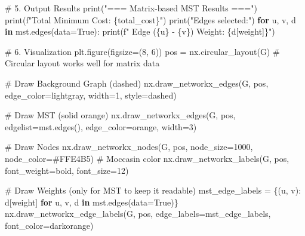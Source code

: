 \documentclass[
  letterpaper,
  DIV=11,
  numbers=noendperiod]{scrreprt}
\newenvironment{Shaded}{\begin{snugshade}}{\end{snugshade}}
\newcommand{\BuiltInTok}[1]{\textcolor[rgb]{0.00,0.23,0.31}{#1}}
\newcommand{\CommentTok}[1]{\textcolor[rgb]{0.37,0.37,0.37}{#1}}
\newcommand{\ControlFlowTok}[1]{\textcolor[rgb]{0.00,0.23,0.31}{\textbf{#1}}}
\newcommand{\DecValTok}[1]{\textcolor[rgb]{0.68,0.00,0.00}{#1}}
\newcommand{\KeywordTok}[1]{\textcolor[rgb]{0.00,0.23,0.31}{\textbf{#1}}}
\newcommand{\NormalTok}[1]{\textcolor[rgb]{0.00,0.23,0.31}{#1}}
\newcommand{\OperatorTok}[1]{\textcolor[rgb]{0.37,0.37,0.37}{#1}}
\newcommand{\SpecialCharTok}[1]{\textcolor[rgb]{0.37,0.37,0.37}{#1}}
\newcommand{\SpecialStringTok}[1]{\textcolor[rgb]{0.13,0.47,0.30}{#1}}
\newcommand{\StringTok}[1]{\textcolor[rgb]{0.13,0.47,0.30}{#1}}
\newcommand{\VariableTok}[1]{\textcolor[rgb]{0.07,0.07,0.07}{#1}}
\begin{document}
\begin{Shaded}
\begin{Highlighting}[]
\CommentTok{\# 5. Output Results}
\BuiltInTok{print}\NormalTok{(}\StringTok{"=== Matrix{-}based MST Results ==="}\NormalTok{)}
\BuiltInTok{print}\NormalTok{(}\SpecialStringTok{f"Total Minimum Cost: }\SpecialCharTok{\{}\NormalTok{total\_cost}\SpecialCharTok{\}}\SpecialStringTok{"}\NormalTok{)}
\BuiltInTok{print}\NormalTok{(}\StringTok{"Edges selected:"}\NormalTok{)}
\ControlFlowTok{for}\NormalTok{ u, v, d }\KeywordTok{in}\NormalTok{ mst.edges(data}\OperatorTok{=}\VariableTok{True}\NormalTok{):}
    \BuiltInTok{print}\NormalTok{(}\SpecialStringTok{f"  Edge (}\SpecialCharTok{\{}\NormalTok{u}\SpecialCharTok{\}}\SpecialStringTok{ {-} }\SpecialCharTok{\{}\NormalTok{v}\SpecialCharTok{\}}\SpecialStringTok{) Weight: }\SpecialCharTok{\{}\NormalTok{d[}\StringTok{\textquotesingle{}weight\textquotesingle{}}\NormalTok{]}\SpecialCharTok{\}}\SpecialStringTok{"}\NormalTok{)}

\CommentTok{\# 6. Visualization}
\NormalTok{plt.figure(figsize}\OperatorTok{=}\NormalTok{(}\DecValTok{8}\NormalTok{, }\DecValTok{6}\NormalTok{))}
\NormalTok{pos }\OperatorTok{=}\NormalTok{ nx.circular\_layout(G)  }\CommentTok{\# Circular layout works well for matrix data}

\CommentTok{\# Draw Background Graph (dashed)}
\NormalTok{nx.draw\_networkx\_edges(G, pos, edge\_color}\OperatorTok{=}\StringTok{\textquotesingle{}lightgray\textquotesingle{}}\NormalTok{, width}\OperatorTok{=}\DecValTok{1}\NormalTok{, style}\OperatorTok{=}\StringTok{\textquotesingle{}dashed\textquotesingle{}}\NormalTok{)}

\CommentTok{\# Draw MST (solid orange)}
\NormalTok{nx.draw\_networkx\_edges(G, pos, edgelist}\OperatorTok{=}\NormalTok{mst.edges(), edge\_color}\OperatorTok{=}\StringTok{\textquotesingle{}orange\textquotesingle{}}\NormalTok{, width}\OperatorTok{=}\DecValTok{3}\NormalTok{)}

\CommentTok{\# Draw Nodes}
\NormalTok{nx.draw\_networkx\_nodes(G, pos, node\_size}\OperatorTok{=}\DecValTok{1000}\NormalTok{, node\_color}\OperatorTok{=}\StringTok{\textquotesingle{}\#FFE4B5\textquotesingle{}}\NormalTok{) }\CommentTok{\# Moccasin color}
\NormalTok{nx.draw\_networkx\_labels(G, pos, font\_weight}\OperatorTok{=}\StringTok{\textquotesingle{}bold\textquotesingle{}}\NormalTok{, font\_size}\OperatorTok{=}\DecValTok{12}\NormalTok{)}

\CommentTok{\# Draw Weights (only for MST to keep it readable)}
\NormalTok{mst\_edge\_labels }\OperatorTok{=}\NormalTok{ \{(u, v): d[}\StringTok{\textquotesingle{}weight\textquotesingle{}}\NormalTok{] }\ControlFlowTok{for}\NormalTok{ u, v, d }\KeywordTok{in}\NormalTok{ mst.edges(data}\OperatorTok{=}\VariableTok{True}\NormalTok{)\}}
\NormalTok{nx.draw\_networkx\_edge\_labels(G, pos, edge\_labels}\OperatorTok{=}\NormalTok{mst\_edge\_labels, font\_color}\OperatorTok{=}\StringTok{\textquotesingle{}darkorange\textquotesingle{}}\NormalTok{)}


\end{Highlighting}
\end{Shaded}
\end{document}
